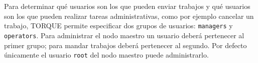 Para determinar qué usuarios son los que pueden enviar trabajos y qué usuarios son los que pueden realizar tareas administrativas, como por ejemplo cancelar un trabajo, TORQUE permite especificar dos grupos de usuarios: \texttt{managers} y \texttt{operators}. Para administrar el nodo maestro un usuario deberá pertenecer al primer grupo; para mandar trabajos deberá pertenecer al segundo. Por defecto únicamente el usuario \texttt{root} del nodo maestro puede administrarlo.

